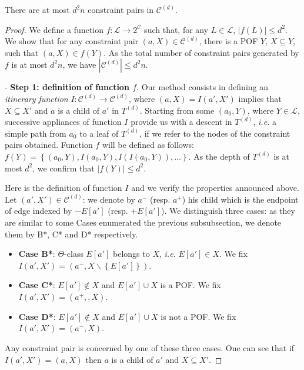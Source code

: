 \documentclass[a4paper,UKenglish,numberwithinsect,cleveref, autoref]{lipics-v2021}
\newcommand{\set}[1]{\left\{ #1 \right\}}
\newcommand{\card}[1]{\left| #1 \right|}
\begin{document}
\begin{theorem}
There are at most $d^2n$ constraint pairs in $\mathcal{C}^{(d)}$.
\label{th:cardinality_c}
\end{theorem}
\begin{proof}
We define a function $f : \mathcal{L} \rightarrow 2^{\mathcal{C}}$ such that, for any $L \in \mathcal{L}$, $\card{f(L)} \le d^2$. We show that for any constraint pair $(a,X) \in \mathcal{C}^{(d)}$, there is a POF $Y$, $X \subseteq Y$, such that $(a,X) \in f(Y)$. As the total number of constraint pairs generated by $f$ is at most $d^2n$, we have $\card{\mathcal{C}^{(d)}} \le d^2n$.

- \textbf{Step 1: definition of function $f$}. Our method consists in defining an \textit{itinerary function} $I : \mathcal{C}^{(d)} \rightarrow \mathcal{C}^{(d)}$, where $(a,X) = I(a',X')$ implies that $X \subseteq X'$ and $a$ is a child of $a'$ in $T^{(d)}$. Starting from some $(a_0,Y)$, where $Y \in \mathcal{L}$, successive appliances of function $I$ provide us with a descent in $T^{(d)}$, {\em i.e.} a simple path from $a_0$ to a leaf of $T^{(d)}$, if we refer to the nodes of the constraint pairs obtained. Function $f$ will be defined as follows: $f(Y) = \set{(a_0,Y),I(a_0,Y),I(I(a_0,Y)),\ldots}$. As the depth of $T^{(d)}$ is at most $d^2$, we confirm that $\card{f(Y)}\le d^2$.

Here is the definition of function $I$ and we verify the properties announced above. Let $(a',X') \in \mathcal{C}^{(d)}$: we denote by $a^-$ (resp. $a^+$) his child which is the endpoint of edge indexed by $-E\left[a'\right]$ (resp. $+E\left[a'\right]$). We distinguish three cases: as they are similar to some Cases enumerated the previous subsubsection, we denote them by B*, C* and D* respectively.
\begin{itemize}
\item \textbf{Case B*}: $\Theta$-class $E\left[a'\right]$ belongs to $X$, {\em i.e.} $E\left[a'\right] \in X$. We fix $I(a',X') = (a^-,X\backslash \set{E\left[a'\right]})$.
\item \textbf{Case C*}: $E\left[a'\right] \notin X$ and $E\left[a'\right] \cup X$ is a POF. We fix $I(a',X') = (a^+,,X)$.
\item \textbf{Case D*}: $E\left[a'\right] \notin X$ and $E\left[a'\right] \cup X$ is not a POF. We fix $I(a',X') = (a^-,X)$.
\end{itemize}
Any constraint pair is concerned by one of these three cases. One can see that if $I(a',X') = (a,X)$ then $a$ is a child of $a'$ and $X \subseteq X'$.


\end{proof}
\end{document}

